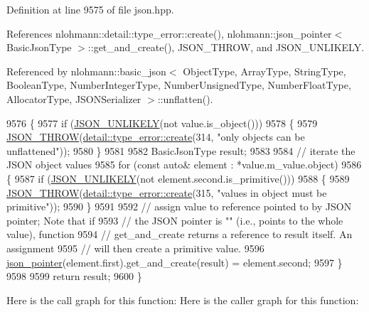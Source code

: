 Definition at line 9575 of file json.\+hpp.



References nlohmann\+::detail\+::type\+\_\+error\+::create(), nlohmann\+::json\+\_\+pointer$<$ Basic\+Json\+Type $>$\+::get\+\_\+and\+\_\+create(), J\+S\+O\+N\+\_\+\+T\+H\+R\+OW, and J\+S\+O\+N\+\_\+\+U\+N\+L\+I\+K\+E\+LY.



Referenced by nlohmann\+::basic\+\_\+json$<$ Object\+Type, Array\+Type, String\+Type, Boolean\+Type, Number\+Integer\+Type, Number\+Unsigned\+Type, Number\+Float\+Type, Allocator\+Type, J\+S\+O\+N\+Serializer $>$\+::unflatten().


\begin{DoxyCode}
9576     \{
9577         \textcolor{keywordflow}{if} (\hyperlink{json_8hpp_ab77582407c64944e7db1ea95ab520253}{JSON\_UNLIKELY}(not value.is\_object()))
9578         \{
9579             \hyperlink{json_8hpp_a6c274f6db2e65c1b66c7d41b06ad690f}{JSON\_THROW}(\hyperlink{classnlohmann_1_1detail_1_1type__error_aecc083aea4b698c33d042670ba50c10f}{detail::type\_error::create}(314, \textcolor{stringliteral}{"only objects
       can be unflattened"}));
9580         \}
9581 
9582         BasicJsonType result;
9583 
9584         \textcolor{comment}{// iterate the JSON object values}
9585         \textcolor{keywordflow}{for} (\textcolor{keyword}{const} \textcolor{keyword}{auto}& element : *value.m\_value.object)
9586         \{
9587             \textcolor{keywordflow}{if} (\hyperlink{json_8hpp_ab77582407c64944e7db1ea95ab520253}{JSON\_UNLIKELY}(not element.second.is\_primitive()))
9588             \{
9589                 \hyperlink{json_8hpp_a6c274f6db2e65c1b66c7d41b06ad690f}{JSON\_THROW}(\hyperlink{classnlohmann_1_1detail_1_1type__error_aecc083aea4b698c33d042670ba50c10f}{detail::type\_error::create}(315, \textcolor{stringliteral}{"values in
       object must be primitive"}));
9590             \}
9591 
9592             \textcolor{comment}{// assign value to reference pointed to by JSON pointer; Note that if}
9593             \textcolor{comment}{// the JSON pointer is "" (i.e., points to the whole value), function}
9594             \textcolor{comment}{// get\_and\_create returns a reference to result itself. An assignment}
9595             \textcolor{comment}{// will then create a primitive value.}
9596             \hyperlink{classnlohmann_1_1json__pointer_a7f32d7c62841f0c4a6784cf741a6e4f8}{json\_pointer}(element.first).get\_and\_create(result) = element.second;
9597         \}
9598 
9599         \textcolor{keywordflow}{return} result;
9600     \}
\end{DoxyCode}
Here is the call graph for this function\+:
Here is the caller graph for this function\+:



